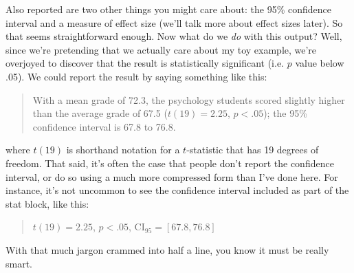 Also reported are two other things you might care about: the 95\% confidence interval and a measure of effect size (we'll talk more about effect sizes later). So that seems straightforward enough. Now what do we {\it do} with this output? Well, since we're pretending that we actually care about my toy example, we're overjoyed to discover that the result is statistically significant (i.e. $p$ value below .05). We could report the result by saying something like this:
\begin{quote}
With a mean grade of 72.3, the psychology students scored slightly higher than the average grade of 67.5 ($t(19) = 2.25$, $p<.05$); the 95\% confidence interval is 67.8 to 76.8.
\end{quote}
where $t(19)$ is shorthand notation for a $t$-statistic that has 19 degrees of freedom. That said, it's often the case that people don't report the confidence interval, or do so using a much more compressed form than I've done here. For instance, it's not uncommon to see the confidence interval included as part of the stat block, like this:
\begin{quote}
$t(19) = 2.25$, $p<.05$, CI$_{95} = [67.8, 76.8]$
\end{quote}
With that much jargon crammed into half a line, you know it must be really smart.


